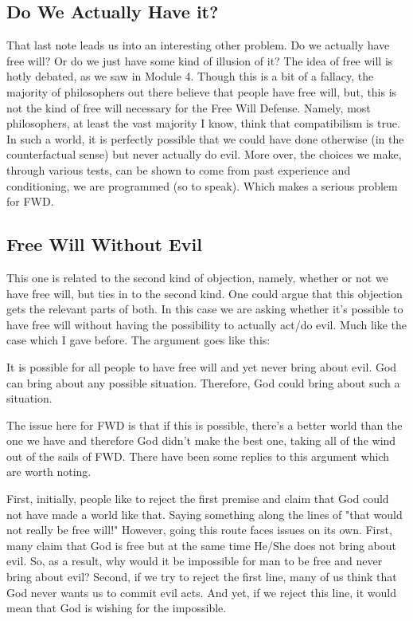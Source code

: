 \subsection{Do We Actually Have it?}

That last note leads us into an interesting other problem. Do we actually have free will? Or do we just have some kind of illusion of it? The idea of free will is hotly debated, as we saw in Module 4. Though this is a bit of a fallacy, the majority of philosophers out there believe that people have free will, but, this is not the kind of free will necessary for the Free Will Defense. Namely, most philosophers, at least the vast majority I know, think that compatibilism is true. In such a world, it is perfectly possible that we could have done otherwise (in the counterfactual sense) but never actually do evil. More over, the choices we make, through various tests, can be shown to come from past experience and conditioning, we are programmed (so to speak). Which makes a serious problem for FWD. 
\subsection{Free Will Without Evil}

This one is related to the second kind of objection, namely, whether or not we have free will, but ties in to the second kind. One could argue that this objection gets the relevant parts of both. In this case we are asking whether it's possible to have free will without having the possibility to actually act/do evil. Much like the case which I gave before. The argument goes like this:

    It is possible for all people to have free will and yet never bring about evil.
    God can bring about any possible situation.
    Therefore, God could bring about such a situation.

The issue here for FWD is that if this is possible, there's a better world than the one we have and therefore God didn't make the best one, taking all of the wind out of the sails of FWD.  There have been some replies to this argument which are worth noting.

First, initially, people like to reject the first premise and claim that God could not have made a world like that. Saying something along the lines of "that would not really be free will!" However, going this route faces issues on its own. First, many claim that God is free but at the same time He/She does not bring about evil. So, as a result, why would it be impossible for man to be free and never bring about evil? Second, if we try to reject the first line, many of us think that God never wants us to commit evil acts. And yet, if we reject this line, it would mean that God is wishing for the impossible.

